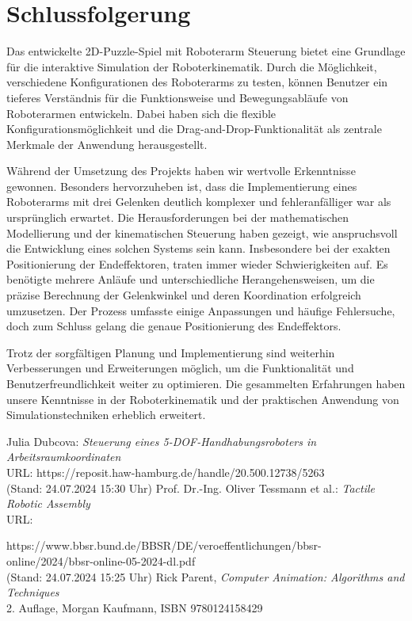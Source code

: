 \documentclass[12pt]{article}
\begin{document}
    \section{Schlussfolgerung}
    Das entwickelte 2D-Puzzle-Spiel mit Roboterarm Steuerung bietet eine Grundlage für die interaktive Simulation
    der Roboterkinematik. Durch die Möglichkeit, verschiedene Konfigurationen des Roboterarms zu testen, können
    Benutzer ein tieferes Verständnis für die Funktionsweise und Bewegungsabläufe von Roboterarmen entwickeln.
    Dabei haben sich die flexible Konfigurationsmöglichkeit und die Drag-and-Drop-Funktionalität als zentrale
    Merkmale der Anwendung herausgestellt.

    Während der Umsetzung des Projekts haben wir wertvolle Erkenntnisse gewonnen. Besonders hervorzuheben ist,
    dass die Implementierung eines Roboterarms mit drei Gelenken deutlich komplexer und fehleranfälliger war als
    ursprünglich erwartet. Die Herausforderungen bei der mathematischen Modellierung und der kinematischen Steuerung
    haben gezeigt, wie anspruchsvoll die Entwicklung eines solchen Systems sein kann. Insbesondere bei der exakten
    Positionierung der Endeffektoren, traten immer wieder Schwierigkeiten auf. Es benötigte mehrere Anläufe und
    unterschiedliche Herangehensweisen, um die präzise Berechnung der Gelenkwinkel und deren Koordination erfolgreich
    umzusetzen. Der Prozess umfasste einige Anpassungen und häufige Fehlersuche, doch zum Schluss gelang die genaue
    Positionierung des Endeffektors.

    Trotz der sorgfältigen Planung und Implementierung sind weiterhin Verbesserungen und Erweiterungen möglich,
    um die Funktionalität und Benutzerfreundlichkeit weiter zu optimieren. Die gesammelten Erfahrungen haben unsere
    Kenntnisse in der Roboterkinematik und der praktischen Anwendung von Simulationstechniken erheblich erweitert.

    \newpage

    \begin{thebibliography}{20} %
        Julia Dubcova: {\it Steuerung eines 5-DOF-Handhabungsroboters in Arbeitsraumkoordinaten} \\
        URL: https://reposit.haw-hamburg.de/handle/20.500.12738/5263 \\
        (Stand: 24.07.2024 15:30 Uhr)
        Prof. Dr.-Ing. Oliver Tessmann et al.: {\it Tactile Robotic Assembly} \\
        URL:
        \raggedright https://www.bbsr.bund.de/BBSR/DE/veroeffentlichungen/bbsr-online/2024/bbsr-online-05-2024-dl.pdf \\
        (Stand: 24.07.2024 15:25 Uhr)
        Rick Parent, {\it Computer Animation: Algorithms and Techniques} \\
        2. Auflage, Morgan Kaufmann, ISBN 9780124158429
    \end{thebibliography}
\end{document}
